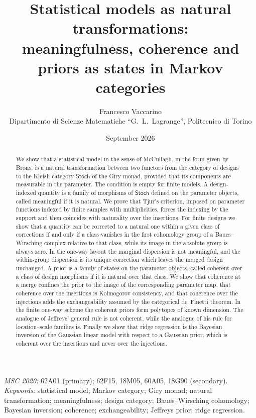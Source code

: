 \documentclass[11pt,a4paper]{article}
\title{Statistical models as natural transformations:\\
meaningfulness, coherence and priors as states in Markov categories}
\author{Francesco Vaccarino\\
\small Dipartimento di Scienze Matematiche ``G.\ L.\ Lagrange'', Politecnico di Torino}
\date{September 2026}
\theoremstyle{plain}
\theoremstyle{definition}
\theoremstyle{remark}
\newcommand{\cat}[1]{\mathsf{#1}}
\newcommand{\Stoch}{\cat{Stoch}}
\begin{document}
\maketitle

\begin{abstract}
\noindent
We show that a statistical model in the sense of McCullagh, in the form given
by Br\o ns, is a natural transformation between two functors from the category
of designs to the Kleisli category $\Stoch$ of the Giry monad, provided that
its components are measurable in the parameter. The condition is empty for
finite models. A design-indexed quantity is
a family of morphisms of $\Stoch$ defined on the parameter objects, called
meaningful if it is natural. We prove that Tjur's criterion, imposed on
parameter functions indexed by finite samples with multiplicities, forces the
indexing by the support and then coincides with naturality over the
insertions. For finite designs we show that a quantity
can be corrected to a natural one within a given class of corrections if and
only if a class vanishes in the first cohomology group of a Baues--Wirsching
complex relative to that class, while its image in the absolute group is
always zero. In the one-way layout the marginal dispersion is not meaningful,
and the within-group dispersion is its unique correction which leaves the
merged design unchanged. A prior is a family of states on the parameter
objects, called coherent over a class of design morphisms if it is natural
over that class. We show that coherence at a merge confines the prior
to the image of the corresponding parameter map, that coherence over the
insertions is Kolmogorov consistency, and that coherence over the injections
adds the exchangeability assumed by the categorical de~Finetti theorem. In the
finite one-way scheme the coherent priors form polytopes of known dimension. The analogue of Jeffreys' general rule is not coherent, while the
analogue of his rule for location--scale families is. Finally we show that
ridge regression is the Bayesian inversion of the Gaussian linear model with
respect to a Gaussian prior, which is coherent over the insertions and never
over the injections.
\end{abstract}

\medskip
\noindent\emph{MSC 2020:} 62A01 (primary); 62F15, 18M05, 60A05, 18G90 (secondary).\\
\emph{Keywords:} statistical model; Markov category; Giry monad; natural
transformation; meaningfulness; design category; Baues--Wirsching cohomology;
Bayesian inversion; coherence; exchangeability; Jeffreys prior; ridge
regression.
\end{document}
